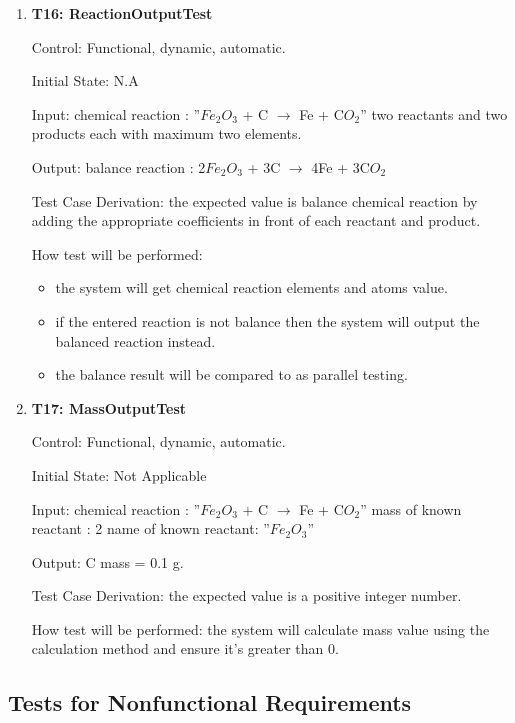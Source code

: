 \documentclass[12pt, titlepage]{article}
\begin{document}
\begin{enumerate}

\item{\bf T16: ReactionOutputTest\\}

Control: Functional, dynamic, automatic.
					
Initial State: N.A
					
Input: 
chemical reaction : ”$Fe_2$$O_3$ + C $\rightarrow$ Fe + C$O_2$”
two reactants and two products each with maximum two elements.
	
Output: balance reaction : 2$Fe_2$$O_3$ + 3C $\rightarrow$ 4Fe + 3C$O_2$

Test Case Derivation: the expected value is balance chemical reaction by adding the appropriate coefficients in front of each reactant and product.

How test will be performed: 
\begin{itemize}
\item the system will get chemical reaction elements and atoms value. 
\item if the entered reaction is not balance then the system will output the balanced reaction instead. 
\item the balance result will be compared to \cite{OnlineBalancer} as parallel testing.
\end{itemize}


\item{\bf T17: MassOutputTest\\}

Control: Functional, dynamic, automatic.
					
Initial State: Not Applicable
					
Input:
\newline
chemical reaction : ”$Fe_2$$O_3$ + C $\rightarrow$ Fe + C$O_2$”
\newline
mass of known reactant : 2
\newline
name of known reactant: ”$Fe_2$$O_3$”
				
Output: C mass = 0.1 g. 

Test Case Derivation: the expected value is a positive integer number. 
					
How test will be performed: 
the system will calculate mass value using the calculation method and ensure it's greater than 0.
 
\end{enumerate}	


\subsection{Tests for Nonfunctional Requirements}
\end{document}
